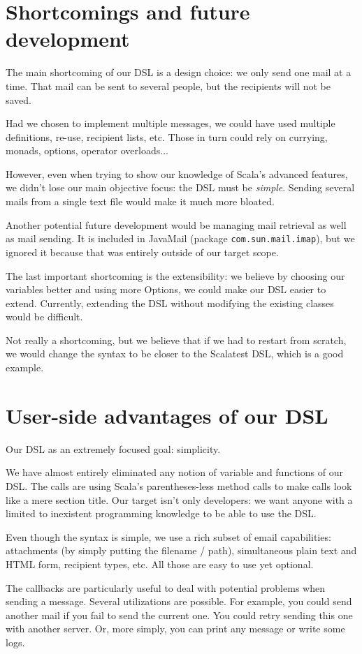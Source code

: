 \documentclass[10pt,a4paper]{article}
\begin{document}
\clearpage

\section{Shortcomings and future development}

	The main shortcoming of our DSL is a design choice: we only send one mail at a time. That mail can be sent to several people, but the recipients will not be saved.
	
	Had we chosen to implement multiple messages, we could have used multiple definitions, re-use, recipient lists, etc. Those in turn could rely on currying, monads, options, operator overloads...
	
	However, even when trying to show our knowledge of Scala's advanced features, we didn't lose our main objective focus: the DSL must be \textit{simple}. Sending several mails from a single text file would make it much more bloated.
	
	\vskip 10pt
	Another potential future development would be managing mail retrieval as well as mail sending. It is included in JavaMail (package \texttt{com.sun.mail.imap}), but we ignored it because that was entirely outside of our target scope.
	
	\vskip 10pt
	The last important shortcoming is the extensibility: we believe by choosing our variables better and using more Options, we could make our DSL easier to extend. Currently, extending the DSL without modifying the existing classes would be difficult.
	
	\vskip 10pt
	Not really a shortcoming, but we believe that if we had to restart from scratch, we would change the syntax to be closer to the Scalatest DSL, which is a good example.

\section{User-side advantages of our DSL}

	Our DSL as an extremely focused goal: simplicity.
	
	We have almost entirely eliminated any notion of variable and functions of our DSL. The calls are using Scala's parentheses-less method calls to make calls look like a mere section title. Our target isn't only developers: we want anyone with a limited to inexistent programming knowledge to be able to use the DSL.
	
	Even though the syntax is simple, we use a rich subset of email capabilities: attachments (by simply putting the filename / path), simultaneous plain text and HTML form, recipient types, etc. All those are easy to use yet optional.
	
	The callbacks are particularly useful to deal with potential problems when sending a message. Several utilizations are possible. For example, you could send another mail if you fail to send the current one. You could retry sending this one with another server. Or, more simply, you can print any message or write some logs.

	
\end{document}
